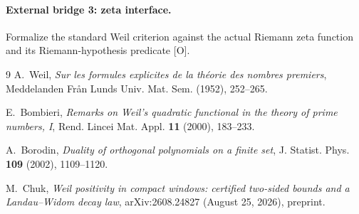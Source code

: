 \documentclass[11pt]{article}
\newcommand{\Ograde}{\textnormal{\small[O]}}
\begin{document}
\paragraph{External bridge 3: zeta interface.}
Formalize the standard Weil criterion against the actual Riemann
zeta function and its Riemann-hypothesis predicate \Ograde.

\medskip\noindent
{}

\begin{thebibliography}{9}
A.~Weil, \emph{Sur les formules explicites de la th\'eorie des
nombres premiers}, Meddelanden Fr\r an Lunds Univ. Mat. Sem. (1952),
252--265.

E.~Bombieri, \emph{Remarks on Weil's quadratic functional in the
theory of prime numbers, I}, Rend. Lincei Mat. Appl. \textbf{11}
(2000), 183--233.

A.~Borodin, \emph{Duality of orthogonal polynomials on a finite set},
J. Statist. Phys. \textbf{109} (2002), 1109--1120.

M.~Chuk, \emph{Weil positivity in compact windows: certified
two-sided bounds and a Landau--Widom decay law},
arXiv:2608.24827 (August 25, 2026), preprint.
\end{thebibliography}
\end{document}

